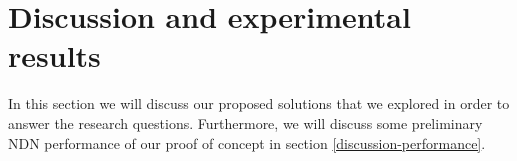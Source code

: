 \section{Discussion and experimental results}\label{disc}







In this section we will discuss our proposed solutions that we explored in order to answer the research questions. Furthermore, we will discuss some preliminary NDN performance of our proof of concept in section \ref{discussion-performance}.







